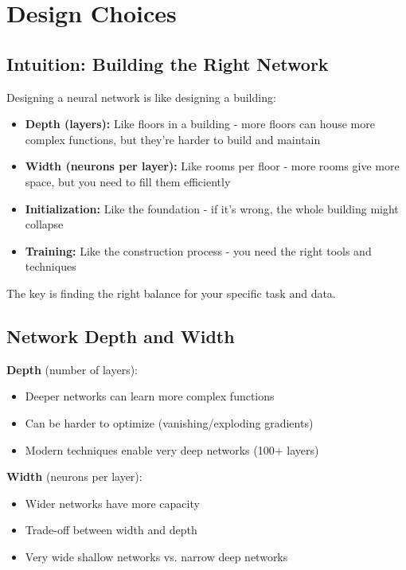 
\section{Design Choices}
\label{sec:design-choices}

\subsection{Intuition: Building the Right Network}

Designing a neural network is like designing a building:
\begin{itemize}
    \item \textbf{Depth (layers):} Like floors in a building - more floors can house more complex functions, but they're harder to build and maintain
    \item \textbf{Width (neurons per layer):} Like rooms per floor - more rooms give more space, but you need to fill them efficiently
    \item \textbf{Initialization:} Like the foundation - if it's wrong, the whole building might collapse
    \item \textbf{Training:} Like the construction process - you need the right tools and techniques
\end{itemize}

The key is finding the right balance for your specific task and data.

\subsection{Network Depth and Width}

\textbf{Depth} (number of layers):
\begin{itemize}
    \item Deeper networks can learn more complex functions
    \item Can be harder to optimize (vanishing/exploding gradients)
    \item Modern techniques enable very deep networks (100+ layers)
\end{itemize}

\textbf{Width} (neurons per layer):
\begin{itemize}
    \item Wider networks have more capacity
    \item Trade-off between width and depth
    \item Very wide shallow networks vs. narrow deep networks
\end{itemize}

